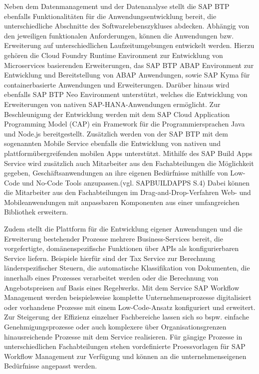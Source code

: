 Neben dem Datenmanagement und der Datenanalyse stellt die SAP BTP ebenfalls Funktionalitäten für die Anwendungsentwicklung bereit, die unterschiedliche Abschnitte des Softwarelebenszykluses abdecken. Abhängig von den jeweiligen funktionalen Anforderungen, können die Anwendungen bzw. Erweiterung auf unterschiedlichen Laufzeitumgebungen entwickelt werden. Hierzu gehören die Cloud Foundry Runtime Environment zur Entwicklung von Microservices basierenden Erweiterungen, das SAP BTP ABAP Environment zur Entwicklung und Bereitstellung von ABAP Anwendungen, sowie SAP Kyma für containerbasierte Anwendungen und Erweiterungen. Darüber hinaus wird ebenfalls SAP BTP Neo Environment unterstützt, welches die Entwicklung von Erweiterungen von nativen SAP-HANA-Anwendungen ermöglicht. Zur Beschleunigung der Entwicklung werden mit dem SAP Cloud Application Programming Model (CAP) ein Framework für die Programmiersprachen Java und Node.js bereitgestellt. Zusätzlich werden von der SAP BTP mit dem sogenannten Mobile Service ebenfalls die Entwicklung von nativen und plattformübergreifenden mobilen Apps unterstützt. Mithilfe des SAP Build Apps Service wird zusätzlich auch Mitarbeiter aus den Fachabteilungen die Möglichkeit gegeben, Geschäftsanwendungen an ihre eigenen Bedürfnisse mithilfe von Low-Code und No-Code Tools anzupassen.(vgl. SAPBUILDAPPS S.4) Dabei können die Mitarbeiter aus den Fachabteilungen im Drag-and-Drop-Verfahren Web- und Mobileanwendungen mit anpassbaren Komponenten aus einer umfangreichen Bibliothek erweitern.

Zudem stellt die Plattform für die Entwicklung eigener Anwendungen und die Erweiterung bestehender Prozesse mehrere Business-Services bereit, die vorgefertigte, domänenspezifische Funktionen über APIs als konfigurierbaren Service liefern. Beispiele hierfür sind der Tax Service zur Berechnung länderspezifischer Steuern, die automatische Klassifikation von Dokumenten, die innerhalb eines Prozesses verarbeitet werden oder die Berechnung von Angebotspreisen auf Basis eines Regelwerks.
Mit dem Service SAP Workflow Management werden beispielsweise komplette Unternehmensprozesse digitalisiert oder vorhandene Prozesse mit einem Low-Code-Ansatz konfiguriert und erweitert. Zur Steigerung der Effizienz einzelner Fachbereiche lassen sich so bspw. einfache Genehmigungsprozesse oder auch komplexere über Organisationsgrenzen hinausreichende Prozesse mit dem Service realisieren. Für gängige Prozesse in unterschiedlichen Fachabteilungen stehen vordefinierte Proessvorlagen für SAP Workflow Management zur Verfügung und können an die unternehmenseigenen Bedürfnisse angepasst werden.

